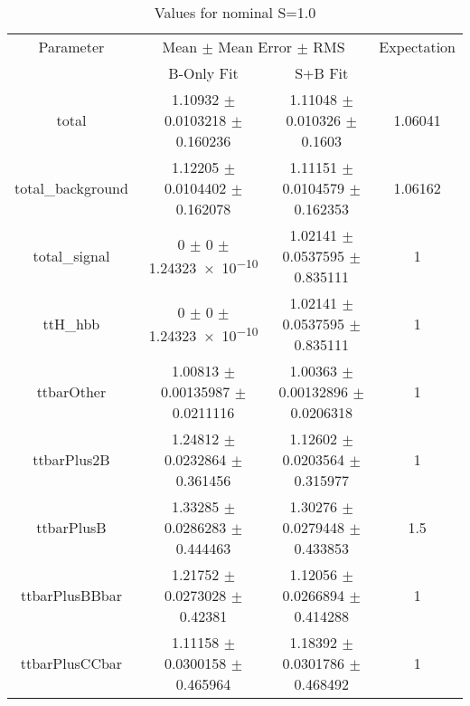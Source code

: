 \begin{table}
\centering
\caption{Values for nominal S=1.0}
\begin{tabular}{cccc}
\toprule
Parameter & \multicolumn{2}{c}{Mean $\pm$ Mean Error $\pm$ RMS} & Expectation\\
 & B-Only Fit & S+B Fit & \\
\midrule
total & \num{1.10932} $\pm$ \num{0.0103218} $\pm$ \num{0.160236} & \num{1.11048} $\pm$ \num{0.010326} $\pm$ \num{0.1603} & \num{1.06041}\\
total\_background & \num{1.12205} $\pm$ \num{0.0104402} $\pm$ \num{0.162078} & \num{1.11151} $\pm$ \num{0.0104579} $\pm$ \num{0.162353} & \num{1.06162}\\
total\_signal & \num{0} $\pm$ \num{0} $\pm$ \num{1.24323e-10} & \num{1.02141} $\pm$ \num{0.0537595} $\pm$ \num{0.835111} & \num{1}\\
ttH\_hbb & \num{0} $\pm$ \num{0} $\pm$ \num{1.24323e-10} & \num{1.02141} $\pm$ \num{0.0537595} $\pm$ \num{0.835111} & \num{1}\\
ttbarOther & \num{1.00813} $\pm$ \num{0.00135987} $\pm$ \num{0.0211116} & \num{1.00363} $\pm$ \num{0.00132896} $\pm$ \num{0.0206318} & \num{1}\\
ttbarPlus2B & \num{1.24812} $\pm$ \num{0.0232864} $\pm$ \num{0.361456} & \num{1.12602} $\pm$ \num{0.0203564} $\pm$ \num{0.315977} & \num{1}\\
ttbarPlusB & \num{1.33285} $\pm$ \num{0.0286283} $\pm$ \num{0.444463} & \num{1.30276} $\pm$ \num{0.0279448} $\pm$ \num{0.433853} & \num{1.5}\\
ttbarPlusBBbar & \num{1.21752} $\pm$ \num{0.0273028} $\pm$ \num{0.42381} & \num{1.12056} $\pm$ \num{0.0266894} $\pm$ \num{0.414288} & \num{1}\\
ttbarPlusCCbar & \num{1.11158} $\pm$ \num{0.0300158} $\pm$ \num{0.465964} & \num{1.18392} $\pm$ \num{0.0301786} $\pm$ \num{0.468492} & \num{1}\\
\bottomrule
\end{tabular}
\end{table}
